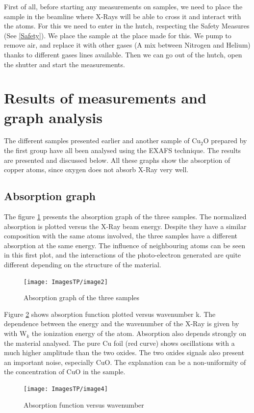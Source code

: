 \documentclass[11pt,a4paper,oneside]{report}
\begin{document}
First of all, before starting any measurements on samples, we need to place the sample in the beamline where X-Rays will be able to cross it and interact with the atoms. For this we need to enter in the hutch, respecting the Safety Measures (See \ref{Safety}). We place the sample at the place made for this. We pump to remove air, and replace it with other gases (A mix between Nitrogen and Helium) thanks to different gases lines available. Then we can go out of the hutch, open the shutter and start the measurements.

\section{Results of measurements and graph analysis} \label{results}

The different samples presented earlier and another sample of Cu$_2$O prepared by the first group have all been analysed using the EXAFS technique. The results are presented and discussed below. All these graphs show the absorption of copper atoms, since oxygen does not absorb X-Ray very well.

\subsection{Absorption graph}
The figure \ref{graph1} presents the absorption graph of the three samples. The normalized absorption is plotted versus the X-Ray beam energy. Despite they have a similar composition with the same atoms involved, the three samples have a different absorption at the same energy. The influence of neighbouring atoms can be seen in this first plot, and the interactions of the photo-electron generated are quite different depending on the structure of the material.
\begin{figure}[H]
    \begin{center}
        \texttt{[image: ImagesTP/image2]}
        \caption{Absorption graph of the three samples}
        \label{graph1}
    \end{center}
\end{figure}

Figure \ref{graph2} shows absorption function plotted versus wavenumber k. The dependence between the energy and the wavenumber of the X-Ray is given by with W$_k$ the ionization energy of the atom.
Absorption also depends strongly on the material analysed. The pure Cu foil (red curve) shows oscillations with a much higher amplitude than the two oxides. The two oxides signals also present an important noise, especially CuO. The explanation can be a non-uniformity of the concentration of CuO in the sample.
\begin{figure}[H]
    \begin{center}
        \texttt{[image: ImagesTP/image4]}
        \caption{Absorption function versus wavenumber}
        \label{graph2}
    \end{center}
\end{figure}
\end{document}
